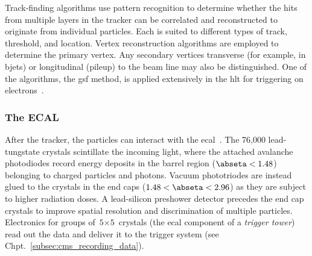 
Track-finding algorithms use pattern recognition to determine whether the hits from multiple layers in the tracker can be correlated and reconstructed to originate from individual particles. Each is suited to different types of track, \pt threshold, and location. Vertex reconstruction algorithms are employed to determine the primary vertex. Any secondary vertices transverse (for example, in \glspl{bjet}) or longitudinal (\gls{pileup}) to the beam line may also be distinguished. One of the algorithms, the \acrfull{gsf} method, is applied extensively in the \acrshort{hlt} for triggering on electrons~\cite{Anuar_2015}.





\subsubsection{The ECAL}
\label{subsubsec:cms_ecal}

After the tracker, the particles can interact with the \acrshort{ecal}~\cite{CERN-LHCC-97-033,Bloch:581342}. The 76,000 lead-tungstate crystals scintillate the incoming light, where the attached avalanche photodiodes record energy deposits in the barrel region ($\abseta < \text{1.48}$) belonging to charged particles and photons. Vacuum phototriodes are instead glued to the crystals in the end caps ($\text{1.48} < \abseta < \text{2.96}$) as they are subject to higher radiation doses. A lead-silicon preshower detector precedes the end cap crystals to improve spatial resolution and discrimination of multiple particles. Electronics for groups of $\text{5}\times\text{5}$ crystals (the \acrshort{ecal} component of a \emph{trigger tower}) read out the data and deliver it to the trigger system (see Chpt.~\ref{subsec:cms_recording_data}).

